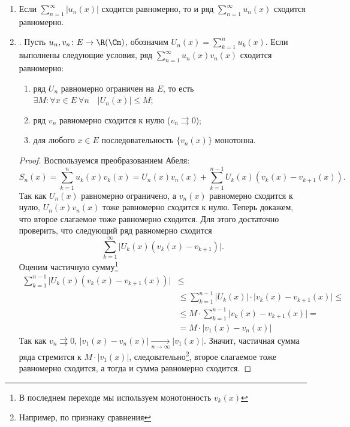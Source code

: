 \begin{prop}
\begin{enumerate}
		\item Если $ \sum_{n=1}^{\infty} \lvert u_n(x) \rvert $ сходится равномерно, то и ряд $ \sum_{n=1}^{\infty} u_n(x)$ сходится равномерно.

		\fontAwesomeSymbol{\faVk}

		\item {}. Пусть $ u_n, v_n \colon E \to \R(\Cm)$, обозначим  $ U_n(x) = \sum_{k=1}^{n} u_k(x)$. Если выполнены следующие условия, ряд $ \sum_{n=1}^{\infty} u_n(x)v_n(x)$ сходится равномерно:
			\begin{enumerate}[noitemsep]
				\item ряд $ U_n$ равномерно ограничен на $ E$, то есть
					$
					\exists M\colon \forall x \in E ~ \forall n \quad \lvert U_n(x) \rvert \le M
					$;
				\item ряд $ v_n$ равномерно сходится к нулю ($ v_n \rightrightarrows 0$);
				\item для любого $ x \in E$ последовательность $ \{v_n(x)\}$ монотонна.
			\end{enumerate}
			\begin{proof}
				Воспользуемся преобразованием Абеля:
				\[
					S_n(x) = \sum_{k=1}^{n} u_k(x)v_k(x) = U_n(x)v_n(x) + \sum_{k=1}^{n-1} U_k(x) (v_k(x) - v_{k+1}(x))
				.\]
				Так как  $ U_n(x)$ равномерно ограничено, а $ v_n(x) $ равномерно сходится к нулю, $ U_n(x)v_n(x)$ тоже равномерно сходится к нулю. Теперь докажем, что второе слагаемое тоже равномерно сходится. Для этого достаточно проверить, что следующий ряд равномерно сходится
				\[
					\sum_{k=1}^{\infty} \lvert U_k(x) (v_k(x) - v_{k+1}) \rvert
				.\]
				Оценим частичную сумму\footnote{В последнем переходе мы используем монотонность $ v_k(x)$}
				\[
					\begin{aligned}
						\sum_{k=1}^{n-1} \lvert U_k(x) (v_k(x) - v_{k+1}(x)) \rvert & \le \\
																					& \le \sum_{k=1}^{n-1} \lvert U_k(x) \rvert \cdot \lvert v_k(x) - v_{k+1}(x) \rvert \le  \\
																					& \le M \cdot \sum_{k=1}^{n-1} \lvert v_k(x) - v_{k+1}(x) \rvert = \\
																					& = M \cdot \lvert v_1(x) - v_n(x) \rvert
					\end{aligned}
				\]
				Так как $ v_n \rightrightarrows 0$, $ \lvert v_1(x) - v_n(x) \rvert \underset{n \to \infty}{\longrightarrow} \lvert v_1(x) \rvert $. Значит, частичная сумма ряда стремится к $ M \cdot \lvert v_1(x) \rvert $, следовательно\footnote{Например, по признаку сравнения}, второе слагаемое тоже равномерно сходится, а тогда и сумма равномерно сходится.
			\end{proof}


\end{enumerate}
\end{prop}
